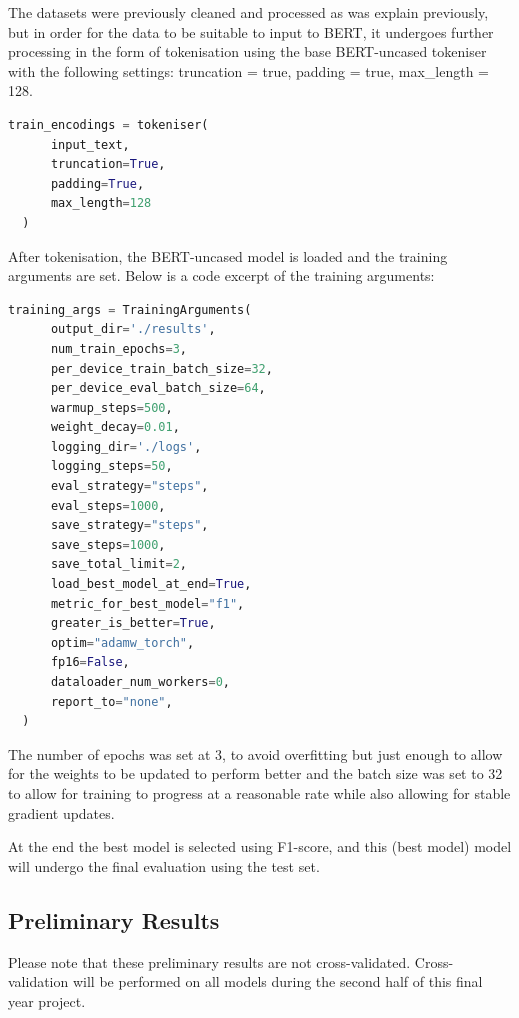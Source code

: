 \documentclass[stu,12pt,floatsintext,donotrepeattitle]{apa7}
\begin{document}
The datasets were previously cleaned and processed as was explain previously, but in order for the data to be suitable to input to BERT, it undergoes further processing in the form of tokenisation using the base BERT-uncased tokeniser with the following settings: truncation = true, padding = true, max\_length = 128. 

\begin{lstlisting}[language=Python, caption={BERT Tokeniser Configuration}]
train_encodings = tokeniser(
      input_text,
      truncation=True,
      padding=True,
      max_length=128
  )
\end{lstlisting}

After tokenisation, the BERT-uncased model is loaded and the training arguments are set. Below is a code excerpt of the training arguments:

\begin{lstlisting}[language=Python, caption={BERT Fine-tuning Configuration}]
training_args = TrainingArguments(
      output_dir='./results',
      num_train_epochs=3,
      per_device_train_batch_size=32,
      per_device_eval_batch_size=64,
      warmup_steps=500,
      weight_decay=0.01,
      logging_dir='./logs',
      logging_steps=50,
      eval_strategy="steps",
      eval_steps=1000,
      save_strategy="steps",
      save_steps=1000,
      save_total_limit=2,
      load_best_model_at_end=True,
      metric_for_best_model="f1",
      greater_is_better=True,
      optim="adamw_torch",
      fp16=False,
      dataloader_num_workers=0,
      report_to="none",
  )
\end{lstlisting}

The number of epochs was set at 3, to avoid overfitting but just enough to allow for the weights to be updated to perform better and the batch size was set to 32 to allow for training to progress at a reasonable rate while also allowing for stable gradient updates.

At the end the best model is selected using F1-score, and this (best model) model will undergo the final evaluation using the test set.
\subsection{Preliminary Results}
Please note that these preliminary results are not cross-validated. Cross-validation will be performed on all models during the second half of this final year project.
\end{document}
